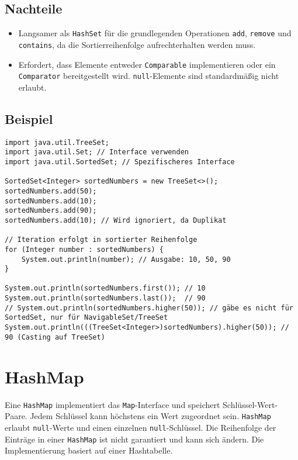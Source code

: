 \subsection{Nachteile}
\begin{itemize}
    \item Langsamer als \texttt{HashSet} für die grundlegenden Operationen \texttt{add}, \texttt{remove} und \texttt{contains}, da die Sortierreihenfolge aufrechterhalten werden muss.
    \item Erfordert, dass Elemente entweder \texttt{Comparable} implementieren oder ein \texttt{Comparator} bereitgestellt wird. \texttt{null}-Elemente sind standardmäßig nicht erlaubt.
\end{itemize}

\subsection{Beispiel}
\begin{lstlisting}[caption={Beispiel für die Verwendung eines TreeSet in Java}, label=lst:treeSetExample]
import java.util.TreeSet;
import java.util.Set; // Interface verwenden
import java.util.SortedSet; // Spezifischeres Interface

SortedSet<Integer> sortedNumbers = new TreeSet<>();
sortedNumbers.add(50);
sortedNumbers.add(10);
sortedNumbers.add(90);
sortedNumbers.add(10); // Wird ignoriert, da Duplikat

// Iteration erfolgt in sortierter Reihenfolge
for (Integer number : sortedNumbers) {
    System.out.println(number); // Ausgabe: 10, 50, 90
}

System.out.println(sortedNumbers.first()); // 10
System.out.println(sortedNumbers.last());  // 90
// System.out.println(sortedNumbers.higher(50)); // gäbe es nicht für SortedSet, nur für NavigableSet/TreeSet
System.out.println(((TreeSet<Integer>)sortedNumbers).higher(50)); // 90 (Casting auf TreeSet)
\end{lstlisting}

\section{HashMap}
Eine \texttt{HashMap} implementiert das \texttt{Map}-Interface und speichert Schlüssel-Wert-Paare. Jedem Schlüssel kann höchstens ein Wert zugeordnet sein. \texttt{HashMap} erlaubt \texttt{null}-Werte und einen einzelnen \texttt{null}-Schlüssel. Die Reihenfolge der Einträge in einer \texttt{HashMap} ist nicht garantiert und kann sich ändern. Die Implementierung basiert auf einer Hashtabelle.

